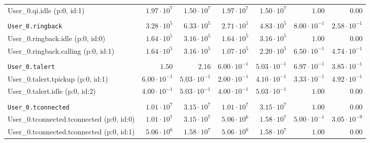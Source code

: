 \begin{table}[htbp]
{\begin{tabular}{lrrrrrr}
\hspace{3mm}User\_0.qi.idle (p:0, id:1)               &  $1.97 \cdot 10^{7}$ &  $1.50 \cdot 10^{7}$ &  $1.97 \cdot 10^{7}$ &  $1.50 \cdot 10^{7}$ &               $1.00$ &               $0.00$ \\
\\[-8pt]\texttt{User\_0.ringback}                     &  $3.28 \cdot 10^{5}$ &  $6.33 \cdot 10^{5}$ &  $2.71 \cdot 10^{5}$ &  $4.83 \cdot 10^{5}$ & $8.00 \cdot 10^{-1}$ & $2.58 \cdot 10^{-1}$ \\
\hspace{3mm}User\_0.ringback.idle (p:0, id:0)         &  $1.64 \cdot 10^{5}$ &  $3.16 \cdot 10^{5}$ &  $1.64 \cdot 10^{5}$ &  $3.16 \cdot 10^{5}$ &               $1.00$ &               $0.00$ \\
\hspace{3mm}User\_0.ringback.calling (p:0, id:1)      &  $1.64 \cdot 10^{5}$ &  $3.16 \cdot 10^{5}$ &  $1.07 \cdot 10^{5}$ &  $2.20 \cdot 10^{5}$ & $6.50 \cdot 10^{-1}$ & $4.74 \cdot 10^{-1}$ \\
\\[-8pt]\texttt{User\_0.talert}                       &               $1.50$ &               $2.16$ & $6.00 \cdot 10^{-1}$ & $5.03 \cdot 10^{-1}$ & $6.97 \cdot 10^{-1}$ & $3.85 \cdot 10^{-1}$ \\
\hspace{3mm}User\_0.talert.tpickup (p:0, id:1)        & $6.00 \cdot 10^{-1}$ & $5.03 \cdot 10^{-1}$ & $2.00 \cdot 10^{-1}$ & $4.10 \cdot 10^{-1}$ & $3.33 \cdot 10^{-1}$ & $4.92 \cdot 10^{-1}$ \\
\hspace{3mm}User\_0.talert.idle (p:0, id:2)           & $4.00 \cdot 10^{-1}$ & $5.03 \cdot 10^{-1}$ & $4.00 \cdot 10^{-1}$ & $5.03 \cdot 10^{-1}$ &               $1.00$ &               $0.00$ \\
\\[-8pt]\texttt{User\_0.tconnected}                   &  $1.01 \cdot 10^{7}$ &  $3.15 \cdot 10^{7}$ &  $1.01 \cdot 10^{7}$ &  $3.15 \cdot 10^{7}$ &               $1.00$ &               $0.00$ \\
\hspace{3mm}User\_0.tconnected.tconnected (p:0, id:0) &  $1.01 \cdot 10^{7}$ &  $3.15 \cdot 10^{7}$ &  $5.06 \cdot 10^{6}$ &  $1.58 \cdot 10^{7}$ & $5.00 \cdot 10^{-1}$ & $3.05 \cdot 10^{-9}$ \\
\hspace{3mm}User\_0.tconnected.tconnected (p:0, id:1) &  $5.06 \cdot 10^{6}$ &  $1.58 \cdot 10^{7}$ &  $5.06 \cdot 10^{6}$ &  $1.58 \cdot 10^{7}$ &               $1.00$ &               $0.00$ \\

\end{tabular}}
\end{table}
